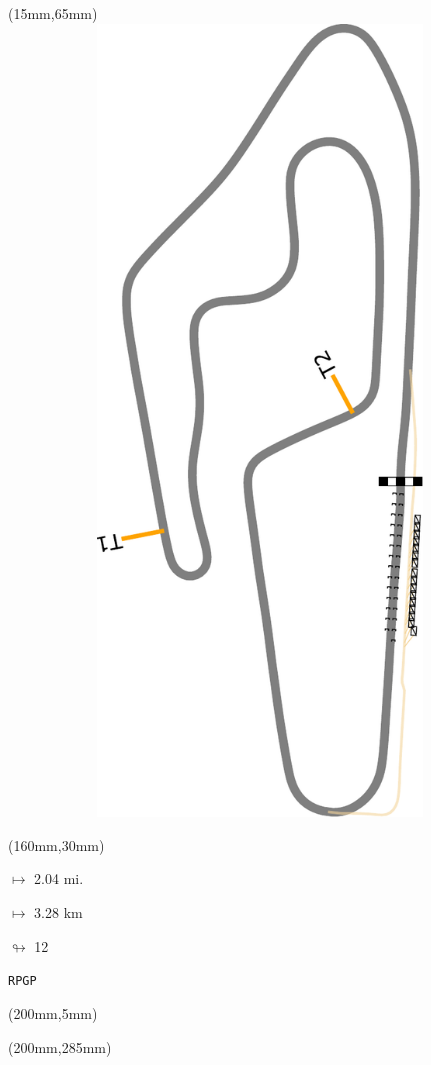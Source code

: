 \begin{textblock*}{185mm}(15mm,65mm)%
\centering
\mbox{\includegraphics[width=185mm,height=210mm,keepaspectratio]{PT/RPGP.pdf}}
\end{textblock*}
\begin{textblock*}{40mm}(160mm,30mm)%
\Large
\par$\mapsto$ 2.04 mi.
\par$\mapsto$ 3.28 km
\par$\looparrowright$ 12
\par\hfill\tiny\tt RPGP\\
\end{textblock*}
\begin{textblock*}{20mm}(200mm,5mm)%
\fbox{\thepage}
\label{RPGP}
\end{textblock*}
\begin{textblock*}{20mm}(200mm,285mm)%
\fbox{\thepage}
\end{textblock*}


